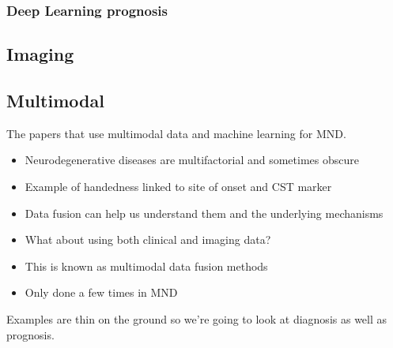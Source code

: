 \subsubsection*{Deep Learning prognosis}

\subsection{Imaging}


\subsection{Multimodal}

The papers that use multimodal data and machine learning for MND.
\begin{itemize}
    \item Neurodegenerative diseases are multifactorial and sometimes obscure
    \item Example of handedness linked to site of onset and CST marker
    \item Data fusion can help us understand them and the underlying mechanisms
    \item What about using both clinical and imaging data?
    \item This is known as multimodal data fusion methods
    \item Only done a few times in MND
\end{itemize}

Examples are thin on the ground so we're going to look at diagnosis as well as prognosis.



